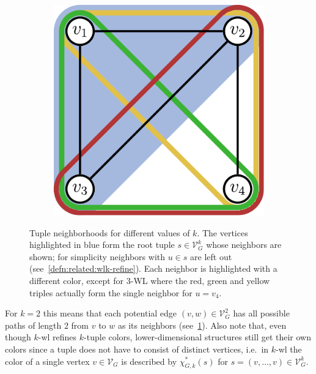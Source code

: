 \begin{figure}[ht]
\begin{subfigure}{0.33\textwidth}
		\label{fig:related:wl-neighbors:2}
	\end{subfigure}%
	\begin{subfigure}{0.33\textwidth}
		\centering
		\includegraphics[width=0.8\linewidth]{gfx/related-work/wl3-neighbors.pdf}
		\label{fig:related:wl-neighbors:3}
	\end{subfigure}
	\caption[\ac{wl} neighborhoods for different values of $k$.]{
		Tuple neighborhoods for different values of $k$.
		The vertices highlighted in \textcolor{t_blue}{blue} form the root tuple $s \in \mathcal{V}_G^k$ whose neighbors are shown;
		for simplicity neighbors with $u \in s$ are left out (see~\cref{defn:related:wlk-refine}).
		Each neighbor is highlighted with a different color, except for 3-WL where the \textcolor{t_red}{red}, \textcolor{t_darkgreen}{green} and \textcolor{t_darkyellow}{yellow} triples actually form the single neighbor for $u = v_4$.
	}\label{fig:related:wl-neighbors}
\end{figure}
For $k = 2$ this means that each potential edge $(v, w) \in \mathcal{V}_G^2$ has all possible paths of length $2$ from $v$ to $w$ as its neighbors (see~\cref{fig:related:wl-neighbors:2}).
Also note that, even though $k$-\acs{wl} refines $k$-tuple colors, lower-dimensional structures still get their own colors since a tuple does not have to consist of distinct vertices, i.e.\ in $k$-\acs{wl} the color of a single vertex $v \in \mathcal{V}_G$ is described by $\chi^{*}_{G, k}(s)$ for $s = (v, \dots, v) \in \mathcal{V}_G^k$.

